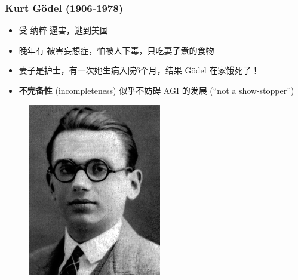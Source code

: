 \documentclass[15pt]{beamer}
\begin{document}
\begin{frame}
\frametitle{Kurt G\"{o}del (1906-1978)}
\begin{minipage}[t]{0.62\linewidth}
	\begin{itemize}
		\item 受 纳粹 逼害，逃到美国
		\item 晚年有 被害妄想症，怕被人下毒，只吃妻子煮的食物
		\item 妻子是护士，有一次她生病入院6个月，结果 G\"{o}del 在家{\color{red}饿死}了！
		\item \textbf{不完备性} (incompleteness) 似乎不妨碍 AGI 的发展 (``not a show-stopper'')
	\end{itemize}
\end{minipage}
\hfill
\begin{minipage}[t]{0.35\linewidth}
	\begin{figure}[H]
		\includegraphics[scale=0.5]{Godel.png}
	\end{figure}
\end{minipage}
\end{frame}
\end{document}
